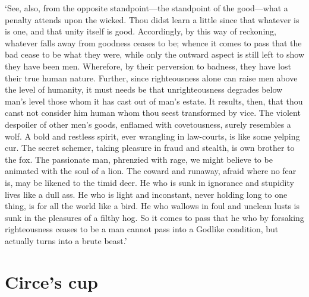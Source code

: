 \documentclass[12pt]{book}
\begin{document}
`See, also, from the opposite standpoint---the standpoint of the
good---what a penalty attends upon the wicked. Thou didst learn a little
since that whatever is is one, and that unity itself is good.
Accordingly, by this way of reckoning, whatever falls away from goodness
ceases to be; whence it comes to pass that the bad cease to be what they
were, while only the outward aspect is still left to show they have been
men. Wherefore, by their perversion to badness, they have lost their
true human nature. Further, since righteousness alone can raise men
above the level of humanity, it must needs be that unrighteousness
degrades below man's level those whom it has cast out of man's estate.
It results, then, that thou canst not consider him human whom thou seest
transformed by vice. The violent despoiler of other men's goods,
enflamed with covetousness, surely resembles a wolf. A bold and restless
spirit, ever wrangling in law-courts, is like some yelping cur. The
secret schemer, taking pleasure in fraud and stealth, is own brother to
the fox. The passionate man, phrenzied with rage, we might believe to be
animated with the soul of a lion. The coward and runaway, afraid where
no fear is, may be likened to the timid deer. He who is sunk in
ignorance and stupidity lives like a dull ass. He who is light and
inconstant, never holding long to one thing, is for all the world like a
bird. He who wallows in foul and unclean lusts is sunk in the pleasures
of a filthy hog. So it comes to pass that he who by forsaking
righteousness ceases to be a man cannot pass into a Godlike condition,
but actually turns into a brute beast.'



\section{Circe's cup}
\end{document}
